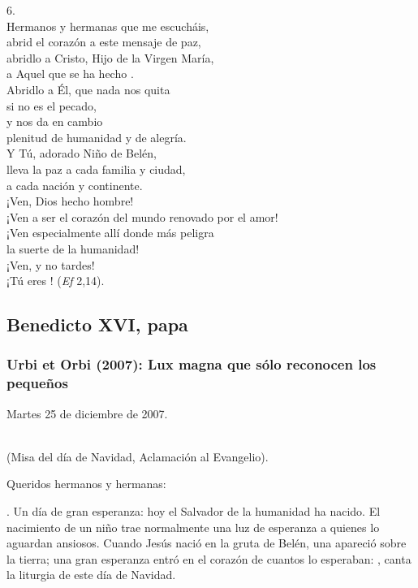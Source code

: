 6. \\ Hermanos y hermanas que me escucháis,\\ abrid el corazón a este mensaje de paz,\\ abridlo a Cristo, Hijo de la Virgen María,\\ a Aquel que se ha hecho .\\ Abridlo a Él, que nada nos quita\\ si no es el pecado,\\ y nos da en cambio\\ plenitud de humanidad y de alegría.\\ Y Tú, adorado Niño de Belén,\\ lleva la paz a cada familia y ciudad,\\ a cada nación y continente.\\ ¡Ven, Dios hecho hombre!\\ ¡Ven a ser el corazón del mundo renovado por el amor!\\ ¡Ven especialmente allí donde más peligra\\ la suerte de la humanidad!\\ ¡Ven, y no tardes!\\ ¡Tú eres ! (\emph{Ef} 2,14).


\subsection{Benedicto XVI, papa}

\subsubsection{Urbi et Orbi (2007): Lux magna que sólo reconocen los pequeños}

Martes 25 de diciembre de 2007.

\\ (Misa del día de Navidad, Aclamación al Evangelio).

Queridos hermanos y hermanas:

. Un día de gran esperanza: hoy el Salvador de la humanidad ha nacido. El nacimiento de un niño trae normalmente una luz de esperanza a quienes lo aguardan ansiosos. Cuando Jesús nació en la gruta de Belén, una  apareció sobre la tierra; una gran esperanza entró en el corazón de cuantos lo esperaban: , canta la liturgia de este día de Navidad.

